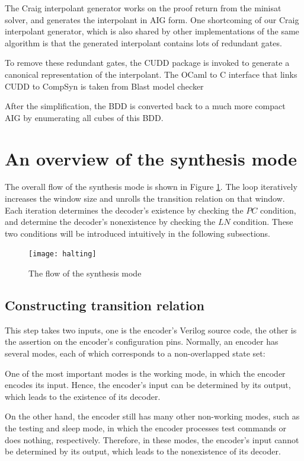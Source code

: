 \documentclass[runningheads,a4paper]{llncs}
\begin{document}
The Craig interpolant generator works on the proof return from the minisat solver,
and generates the interpolant in AIG form.
One shortcoming of our Craig interpolant generator,
which is also shared by other implementations of the same algorithm 
is that the generated interpolant contains lots of redundant gates.

To remove these redundant gates,
the CUDD package is invoked to generate a canonical representation of the interpolant.
The OCaml to C interface that links CUDD to CompSyn is taken from Blast model checker

After the simplification,
the BDD is converted back to a much more compact AIG by enumerating all cubes of this BDD.

\section{An overview of the synthesis mode}\label{sec_syn}

The overall flow of the synthesis mode is shown in Figure \ref{fig_halting}.
The loop iteratively increases the window size and unrolls the transition relation on that window.
Each iteration determines the decoder's existence by checking the $PC$ condition,
and determine the decoder's nonexistence by checking the $LN$ condition.
These two conditions will be introduced intuitively in the following subsections.

\begin{figure}[t]
\centering
\texttt{[image: halting]}
\caption{The flow of the synthesis mode}
\label{fig_halting}
\end{figure}

\subsection{Constructing transition relation}

This step takes two inputs,
one is the encoder's Verilog source code,
the other is the assertion on the encoder's configuration pins.
Normally,
an encoder has several modes,
each of which corresponds to a non-overlapped state set:

One of the most important modes is the working mode,
in which the encoder encodes its input.
Hence,
the encoder's input can be determined by its output,
which leads to the existence of its decoder.

On the other hand,
the encoder still has many other non-working modes,
such as the testing and sleep mode,
in which the encoder processes test commands or does nothing,
respectively.
Therefore,
in these modes,
the encoder's input cannot be determined by its output,
which leads to the nonexistence of its decoder.
\end{document}
